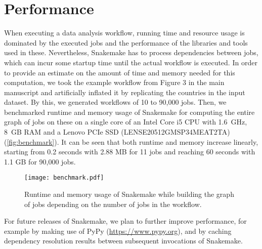 \documentclass{scrartcl}
\let\plainurl\url
\renewcommand{\url}[1]{\protect\plainurl{#1}}
\begin{document}
\section{Performance}

When executing a data analysis workflow, running time and resource usage is dominated by the executed jobs and the performance of the libraries and tools used in these.
Nevertheless, Snakemake has to process dependencies between jobs, which can incur some startup time until the actual workflow is executed.
In order to provide an estimate on the amount of time and memory needed for this computation, we took the example workflow from Figure 3 in the main manuscript and artificially inflated it by replicating the countries in the input dataset.
By this, we generated workflows of 10 to 90,000 jobs.
Then, we benchmarked runtime and memory usage of Snakemake for computing the entire graph of jobs on these on a single core of an Intel Core i5 CPU with 1.6~GHz, 8~GB RAM and a Lenovo PCIe SSD (LENSE20512GMSP34MEAT2TA) (\autoref{fig:benchmark}).
It can be seen that both runtime and memory increase linearly, starting from 0.2 seconds with 2.88 MB for 11 jobs and reaching 60 seconds with 1.1 GB for 90,000 jobs.

\begin{figure}
 \centering
 \texttt{[image: benchmark.pdf]}
 \caption{Runtime and memory usage of Snakemake while building the graph of jobs depending on the number of jobs in the workflow.}\label{fig:benchmark}
\end{figure}

For future releases of Snakemake, we plan to further improve performance, for example by making use of PyPy (\url{https://www.pypy.org}), and by caching dependency resolution results between subsequent invocations of Snakemake.


\printbibliography
\end{document}
